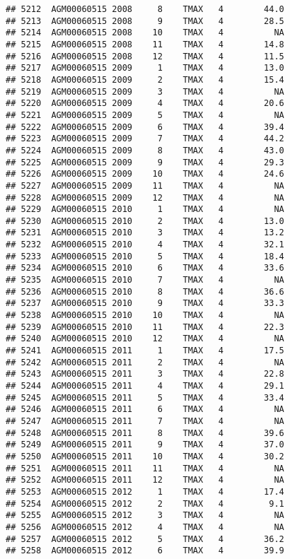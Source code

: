 \documentclass{article}\usepackage[]{graphicx}\usepackage[]{color}
\makeatletter
\newenvironment{kframe}{%
 \def\at@end@of@kframe{}%
 \ifinner\ifhmode%
  \def\at@end@of@kframe{\end{minipage}}%
  \begin{minipage}{\columnwidth}%
 \fi\fi%
 \def\FrameCommand##1{\hskip\@totalleftmargin \hskip-\fboxsep
 \colorbox{shadecolor}{##1}\hskip-\fboxsep
     \hskip-\linewidth \hskip-\@totalleftmargin \hskip\columnwidth}%
 \MakeFramed {\advance\hsize-\width
   \@totalleftmargin\z@ \linewidth\hsize
   \@setminipage}}%
 {\par\unskip\endMakeFramed%
 \at@end@of@kframe}
\newenvironment{knitrout}{}{} %
\makeatother
\begin{document}
\begin{knitrout}
\begin{kframe}
\begin{verbatim}
## 5212  AGM00060515 2008     8    TMAX   4        44.0
## 5213  AGM00060515 2008     9    TMAX   4        28.5
## 5214  AGM00060515 2008    10    TMAX   4          NA
## 5215  AGM00060515 2008    11    TMAX   4        14.8
## 5216  AGM00060515 2008    12    TMAX   4        11.5
## 5217  AGM00060515 2009     1    TMAX   4        13.0
## 5218  AGM00060515 2009     2    TMAX   4        15.4
## 5219  AGM00060515 2009     3    TMAX   4          NA
## 5220  AGM00060515 2009     4    TMAX   4        20.6
## 5221  AGM00060515 2009     5    TMAX   4          NA
## 5222  AGM00060515 2009     6    TMAX   4        39.4
## 5223  AGM00060515 2009     7    TMAX   4        44.2
## 5224  AGM00060515 2009     8    TMAX   4        43.0
## 5225  AGM00060515 2009     9    TMAX   4        29.3
## 5226  AGM00060515 2009    10    TMAX   4        24.6
## 5227  AGM00060515 2009    11    TMAX   4          NA
## 5228  AGM00060515 2009    12    TMAX   4          NA
## 5229  AGM00060515 2010     1    TMAX   4          NA
## 5230  AGM00060515 2010     2    TMAX   4        13.0
## 5231  AGM00060515 2010     3    TMAX   4        13.2
## 5232  AGM00060515 2010     4    TMAX   4        32.1
## 5233  AGM00060515 2010     5    TMAX   4        18.4
## 5234  AGM00060515 2010     6    TMAX   4        33.6
## 5235  AGM00060515 2010     7    TMAX   4          NA
## 5236  AGM00060515 2010     8    TMAX   4        36.6
## 5237  AGM00060515 2010     9    TMAX   4        33.3
## 5238  AGM00060515 2010    10    TMAX   4          NA
## 5239  AGM00060515 2010    11    TMAX   4        22.3
## 5240  AGM00060515 2010    12    TMAX   4          NA
## 5241  AGM00060515 2011     1    TMAX   4        17.5
## 5242  AGM00060515 2011     2    TMAX   4          NA
## 5243  AGM00060515 2011     3    TMAX   4        22.8
## 5244  AGM00060515 2011     4    TMAX   4        29.1
## 5245  AGM00060515 2011     5    TMAX   4        33.4
## 5246  AGM00060515 2011     6    TMAX   4          NA
## 5247  AGM00060515 2011     7    TMAX   4          NA
## 5248  AGM00060515 2011     8    TMAX   4        39.6
## 5249  AGM00060515 2011     9    TMAX   4        37.0
## 5250  AGM00060515 2011    10    TMAX   4        30.2
## 5251  AGM00060515 2011    11    TMAX   4          NA
## 5252  AGM00060515 2011    12    TMAX   4          NA
## 5253  AGM00060515 2012     1    TMAX   4        17.4
## 5254  AGM00060515 2012     2    TMAX   4         9.1
## 5255  AGM00060515 2012     3    TMAX   4          NA
## 5256  AGM00060515 2012     4    TMAX   4          NA
## 5257  AGM00060515 2012     5    TMAX   4        36.2
## 5258  AGM00060515 2012     6    TMAX   4        39.9

\end{verbatim}
\end{kframe}
\end{knitrout}
\end{document}
